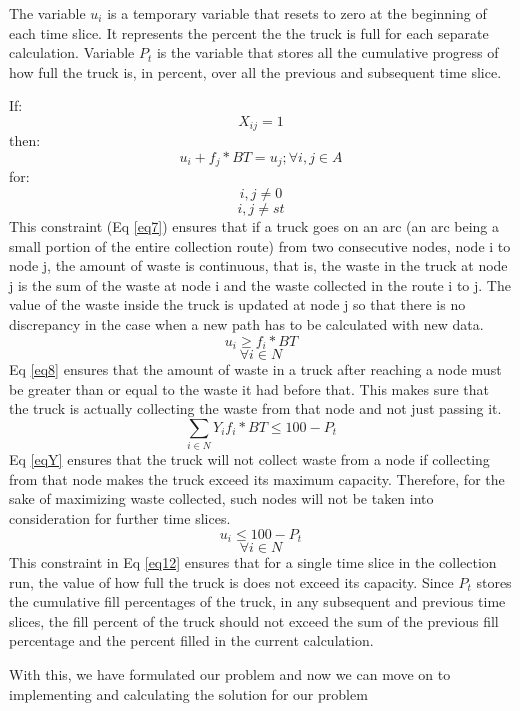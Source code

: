 \documentclass[12pt]{article}
\begin{document}
The variable $u_i$ is a temporary variable that resets to zero at the beginning of each time slice. It represents the percent the the truck is full for each separate calculation. Variable $P_t$ is the variable that stores all the cumulative progress of how full the truck is, in percent, over all the previous and subsequent time slice.

If:
$$ X_{ij}=1$$
then:
\begin{equation}\label{eq7}
    u_i+f_j*BT =u_j ; \forall i,j \in A 
\end{equation}
for: 
$$ i,j\ne 0$$
$$ i,j \ne st $$
This constraint (Eq \eqref{eq7}) ensures that if a truck goes on an arc (an arc being a small portion of the entire collection route) from two consecutive nodes, node i to node j, the amount of waste is continuous, that is, the waste in the truck at node j is the sum of the waste at node i and the waste collected in the route i to j. The value of the waste inside the truck is updated at node j so that there is no discrepancy in the case when a new path has to be calculated with new data.
\begin{equation}\label{eq8}
    u_i\ge f_i*BT
\end{equation}
$$  \forall i\in N$$
Eq \eqref{eq8} ensures that the amount of waste in a truck after reaching a node must be greater than or equal to the waste it had before that. This makes sure that the truck is actually collecting the waste from that node and not just passing it.
\begin{equation}\label{eqY}
	\sum_{i\in N}Y_i f_i* BT\le100-P_t
\end{equation}
Eq \eqref{eqY} ensures that the truck will not collect waste from a node if collecting from that node makes the truck exceed its maximum capacity. Therefore, for the sake of maximizing waste collected, such nodes will not be taken into consideration for further time slices.
\begin{equation}\label{eq12}
    u_i\le 100 - P_t
\end{equation}
$$\forall i \in N $$
This constraint in Eq \eqref{eq12} ensures that for a single time slice in the collection run, the value of how full the truck is does not exceed its capacity. Since $P_t$ stores the cumulative fill percentages of the truck, in any subsequent and previous time slices, the fill percent of the truck should not exceed the sum of the previous fill percentage and the percent filled in the current calculation. 

With this, we have formulated our problem and now we can move on to implementing and calculating the solution for our problem
\end{document}
